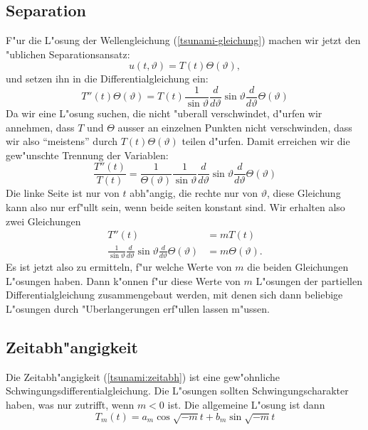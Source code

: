 \subsection{Separation}
F"ur die L"osung der Wellengleichung (\ref{tsunami-gleichung}) machen
wir jetzt den "ublichen Separationsansatz:
$$
u(t,\vartheta)=T(t)\Theta(\vartheta),
$$
und setzen ihn in die Differentialgleichung ein:
$$
T''(t)\Theta(\vartheta)=
T(t)
\frac1{\sin\vartheta}
\frac{d}{d\vartheta}
\sin\vartheta
\frac{d}{d\vartheta}\Theta(\vartheta)
$$
Da wir eine L"osung suchen, die nicht "uberall verschwindet,
d"urfen wir annehmen, dass $T$ und $\Theta$ ausser an einzelnen
Punkten nicht verschwinden, dass wir also ``meistens'' durch
$T(t)\Theta(\vartheta)$ teilen d"urfen. Damit erreichen wir
die gew"unschte Trennung der Variablen:
\begin{equation}
\frac{T''(t)}{T(t)}
=
\frac1{\Theta(\vartheta)}
\frac1{\sin\vartheta}
\frac{d}{d\vartheta}
\sin\vartheta
\frac{d}{d\vartheta}\Theta(\vartheta)
\label{tsunami-separiert}
\end{equation}
Die linke Seite ist nur von $t$ abh"angig, die rechte nur von $\vartheta$,
diese Gleichung kann also nur erf"ullt sein, wenn beide seiten konstant
sind.  Wir erhalten also zwei Gleichungen
\begin{align}
T''(t)&=mT(t)
\label{tsunami:zeitabh}
\\
\frac1{\sin\vartheta}
\frac{d}{d\vartheta}
\sin\vartheta
\frac{d}{d\vartheta}\Theta(\vartheta)
&=m\Theta(\vartheta).
\label{tsunami:winkelabh}
\end{align}
Es ist jetzt also zu ermitteln, f"ur welche Werte von $m$ die beiden
Gleichungen L"osungen haben. Dann k"onnen f"ur diese Werte von $m$ 
L"osungen der partiellen Differentialgleichung zusammengebaut werden,
mit denen sich dann beliebige L"osungen durch "Uberlangerungen
erf"ullen lassen m"ussen.

\subsection{Zeitabh"angigkeit}
Die Zeitabh"angigkeit (\ref{tsunami:zeitabh}) ist eine gew"ohnliche
Schwingungsdifferentialgleichung.
Die L"osungen sollten Schwingungscharakter haben, was nur zutrifft, wenn
$m<0$ ist. Die allgemeine L"osung ist dann
\[
T_m(t)=a_m\cos\sqrt{-m}t+b_m\sin\sqrt{-m}t
\]

